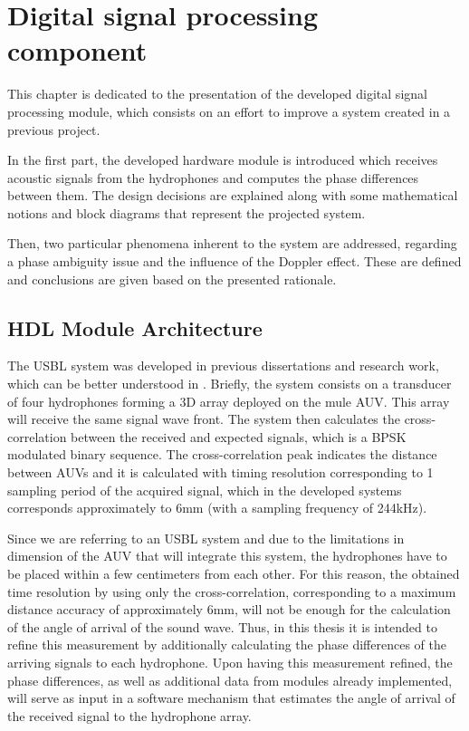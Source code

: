 \chapter{Digital signal processing component} \label{chap:hdl}

This chapter is dedicated to the presentation of the developed digital signal processing module, which consists on an effort to improve a system created in a previous project.

In the first part, the developed hardware module is introduced which receives acoustic signals from the hydrophones and computes the phase differences between them. The design decisions are explained along with some mathematical notions and block diagrams that represent the projected system. 

Then, two particular phenomena inherent to the system are addressed, regarding a phase ambiguity issue and the influence of the Doppler effect. These are defined and conclusions are given based on the presented rationale.

\section{HDL Module Architecture} \label{subchap:HDL module}

The USBL system was developed in previous dissertations and research work, which can be better understood in \cite{afonso-thesis}. Briefly, the system consists on a transducer of four hydrophones forming a 3D array deployed on the mule AUV. This array will receive the same signal wave front. The system then calculates the cross-correlation between the received and expected signals, which is a BPSK modulated binary sequence. The cross-correlation peak indicates the distance between AUVs and it is calculated with timing resolution corresponding to 1 sampling period of the acquired signal, which in the developed systems corresponds approximately to 6mm (with a sampling frequency of 244kHz).

Since we are referring to an USBL system and due to the limitations in dimension of the AUV that will integrate this system, the hydrophones have to be placed within a few centimeters from each other. For this reason, the obtained time resolution by using only the cross-correlation, corresponding to a maximum distance accuracy of approximately 6mm, will not be enough for the calculation of the angle of arrival of the sound wave. Thus, in this thesis it is intended to refine this measurement by additionally calculating the phase differences of the arriving signals to each hydrophone. Upon having this measurement refined, the phase differences, as well as additional data from modules already implemented, will serve as input in a software mechanism that estimates the angle of arrival of the received signal to the hydrophone array.

